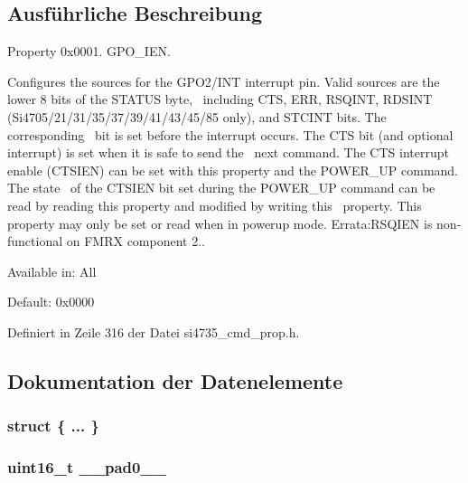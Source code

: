 \subsection{Ausführliche Beschreibung}
Property 0x0001. G\+P\+O\+\_\+\+I\+E\+N. 

Configures the sources for the G\+P\+O2/\+I\+N\+T interrupt pin. Valid sources are the lower 8 bits of the S\+T\+A\+T\+U\+S byte,~\newline
including C\+T\+S, E\+R\+R, R\+S\+Q\+I\+N\+T, R\+D\+S\+I\+N\+T (Si4705/21/31/35/37/39/41/43/45/85 only), and S\+T\+C\+I\+N\+T bits. The corresponding~\newline
bit is set before the interrupt occurs. The C\+T\+S bit (and optional interrupt) is set when it is safe to send the~\newline
next command. The C\+T\+S interrupt enable (C\+T\+S\+I\+E\+N) can be set with this property and the P\+O\+W\+E\+R\+\_\+\+U\+P command. The state~\newline
of the C\+T\+S\+I\+E\+N bit set during the P\+O\+W\+E\+R\+\_\+\+U\+P command can be read by reading this property and modified by writing this~\newline
property. This property may only be set or read when in powerup mode. Errata\+:R\+S\+Q\+I\+E\+N is non-\/functional on F\+M\+R\+X component 2..

Available in\+: All

Default\+: 0x0000 

Definiert in Zeile 316 der Datei si4735\+\_\+cmd\+\_\+prop.\+h.



\subsection{Dokumentation der Datenelemente}
\hypertarget{uniongpo__ien_a4c1b82d426b66a5db741791b4b28573d}{}\subsubsection[{"@41}]{\setlength{\rightskip}{0pt plus 5cm}struct \{ ... \} }\label{uniongpo__ien_a4c1b82d426b66a5db741791b4b28573d}
\hypertarget{uniongpo__ien_a77132c2c26a75f5b8751b235cda23828}{}
\subsubsection[{\+\_\+\+\_\+pad0\+\_\+\+\_\+}]{\setlength{\rightskip}{0pt plus 5cm}uint16\+\_\+t \+\_\+\+\_\+pad0\+\_\+\+\_\+}\label{uniongpo__ien_a77132c2c26a75f5b8751b235cda23828}


